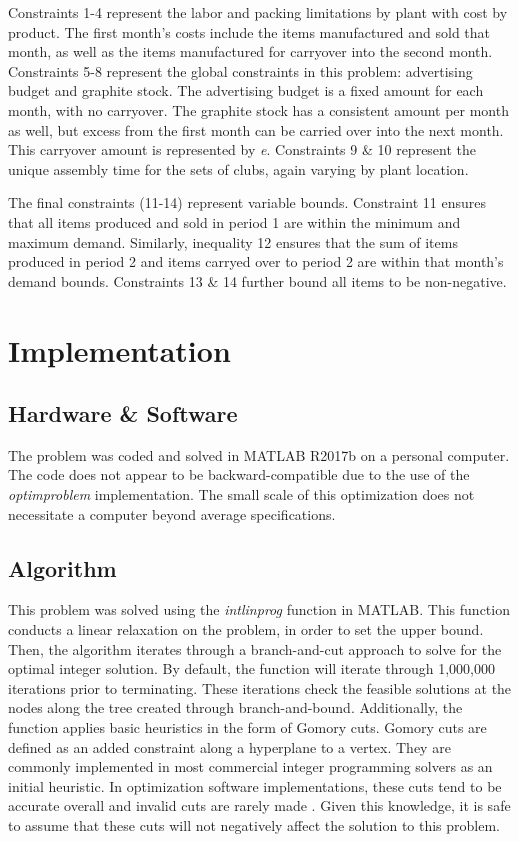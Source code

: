 \documentclass{article}
\begin{document}
Constraints 1-4 represent the labor and packing limitations by plant with cost by product.  The first month's costs include the items manufactured and sold that month, as well as the items manufactured 
for carryover into the second month.  Constraints 5-8 represent the global constraints in this problem:  advertising budget and graphite stock.  The advertising budget is a fixed amount for each month, with no carryover. The 
graphite stock has a consistent amount per month as well, but excess from the first month can be carried over into the next month.  This carryover amount is represented by \textit{e}.  Constraints 9 \& 10 represent the unique assembly time 
for the sets of clubs, again varying by plant location. 
\par
The final constraints (11-14) represent variable bounds.  Constraint 11 ensures that all items produced and sold in period 1 are within the minimum and maximum demand.  Similarly, inequality 12 ensures that the sum of items produced in period 2 and items carryed over to 
period 2 are within that month's demand bounds.  Constraints 13 \& 14 further bound all items to be non-negative.


\section{Implementation}
\subsection{Hardware \& Software}
The problem was coded and solved in MATLAB R2017b on a personal computer.  The code does not appear to be backward-compatible due to the use of the \textit{optimproblem} implementation.  The small scale of this optimization does not necessitate a computer beyond average specifications.
\subsection{Algorithm}
This problem was solved using the \textit{intlinprog} function in MATLAB.  This function conducts a linear relaxation on the problem, in order to set the upper bound.  Then, the algorithm iterates through a branch-and-cut approach to solve for the optimal integer solution.  By default, the function 
will iterate through 1,000,000 iterations prior to terminating.  These iterations check the feasible solutions at the nodes along the tree created through branch-and-bound.  Additionally, the function applies basic heuristics in the form of Gomory cuts.  Gomory cuts are defined as an added constraint along a hyperplane to a vertex.  They are commonly implemented in most commercial integer programming solvers as an initial heuristic.  In optimization software implementations, these cuts tend to be accurate overall and invalid cuts are rarely made \cite{gomory}.  Given this knowledge, it is safe to assume that these cuts will not negatively affect the solution to this problem.
\end{document}
